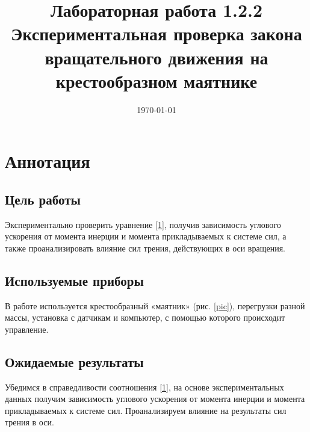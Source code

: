 \documentclass[a4paper,12pt]{article} %
\date{\today}
\title{Лабораторная работа 1.2.2 Экспериментальная проверка закона вращательного движения на крестообразном маятнике}
\date{}
\begin{document}
\maketitle
\section{Аннотация}
\subsection{Цель работы}
Экспериментально проверить уравнение \eqref{1}, получив зависимость углового ускорения от момента инерции и момента
прикладываемых к системе сил, а также проанализировать влияние
сил трения, действующих в оси вращения.

\subsection{Используемые приборы}
В работе используется крестообразный «маятник» (рис. \ref{pic}), перегрузки разной массы, установка с датчикам и компьютер, с помощью которого происходит управление.

\subsection{Ожидаемые результаты}
Убедимся в справедливости соотношения \eqref{1}, на основе экспериментальных данных получим зависимость углового ускорения от момента инерции и момента прикладываемых к системе сил. Проанализируем влияние на результаты сил трения в оси.
\end{document}
